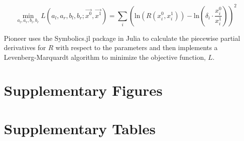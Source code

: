 \documentclass[pdflatex,sn-nature]{sn-jnl}
\begin{document}
\begin{equation}
    \min_{a_l, a_r, b_l, b_r} L(a_l, a_r, b_l, b_r; \vec{x^0}, \vec{x^1}) = \sum_i \left(\text{ln}\left(R(x_i^0, x_i^1)\right) - \text{ln}\left(\delta_i \cdot \frac{x_{i}^{0}}{x_{i}^{1}}\right)\right)^2
\end{equation}

Pioneer uses the Symbolics.jl package in Julia to calculate the piecewise partial derivatives for $R$ with respect to the parameters and then implements a Levenberg-Marquardt algorithm to minimize the objective function, $L$.




















\section{Supplementary Figures}









\section{Supplementary Tables}
\end{document}
